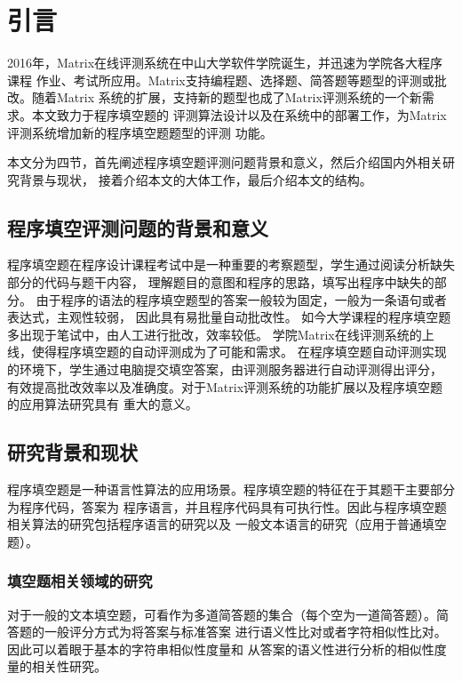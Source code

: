 \chapter{引言}
2016年，Matrix在线评测系统在中山大学软件学院诞生，并迅速为学院各大程序课程
作业、考试所应用。Matrix支持编程题、选择题、简答题等题型的评测或批改。随着Matrix
系统的扩展，支持新的题型也成了Matrix评测系统的一个新需求。本文致力于程序填空题的
评测算法设计以及在系统中的部署工作，为Matrix评测系统增加新的程序填空题题型的评测
功能。

本文分为四节，首先阐述程序填空题评测问题背景和意义，然后介绍国内外相关研究背景与现状，
接着介绍本文的大体工作，最后介绍本文的结构。
\label{cha:introduction}
\section{程序填空评测问题的背景和意义}
\label{sec:background}
程序填空题在程序设计课程考试中是一种重要的考察题型，学生通过阅读分析缺失部分的代码与题干内容，
理解题目的意图和程序的思路，填写出程序中缺失的部分。
由于程序的语法的程序填空题型的答案一般较为固定，一般为一条语句或者表达式，主观性较弱，
因此具有易批量自动批改性。
如今大学课程的程序填空题多出现于笔试中，由人工进行批改，效率较低。
学院Matrix在线评测系统的上线，使得程序填空题的自动评测成为了可能和需求。
在程序填空题自动评测实现的环境下，学生通过电脑提交填空答案，由评测服务器进行自动评测得出评分，
有效提高批改效率以及准确度。对于Matrix评测系统的功能扩展以及程序填空题的应用算法研究具有
重大的意义。
\section{研究背景和现状}
\label{src:related_work}
程序填空题是一种语言性算法的应用场景。程序填空题的特征在于其题干主要部分为程序代码，答案为
程序语言，并且程序代码具有可执行性。因此与程序填空题相关算法的研究包括程序语言的研究以及
一般文本语言的研究（应用于普通填空题）。
\subsection{填空题相关领域的研究}
\label{src:program_filling_related_work}
对于一般的文本填空题，可看作为多道简答题的集合（每个空为一道简答题）。简答题的一般评分方式为将答案与标准答案
进行语义性比对或者字符相似性比对。
因此可以着眼于基本的字符串相似性度量和
从答案的语义性进行分析的相似性度量的相关性研究。

